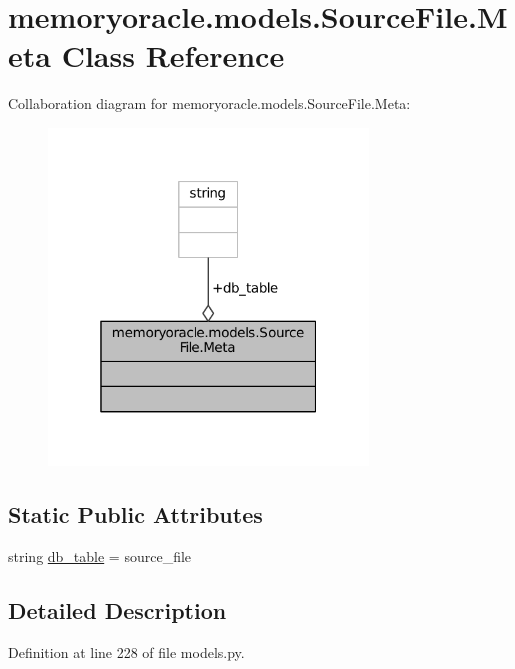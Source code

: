 \hypertarget{classmemoryoracle_1_1models_1_1SourceFile_1_1Meta}{}\section{memoryoracle.\+models.\+Source\+File.\+Meta Class Reference}
\label{classmemoryoracle_1_1models_1_1SourceFile_1_1Meta}


Collaboration diagram for memoryoracle.\+models.\+Source\+File.\+Meta\+:\nopagebreak
\begin{figure}[H]
\begin{center}
\leavevmode
\includegraphics[width=241pt]{classmemoryoracle_1_1models_1_1SourceFile_1_1Meta__coll__graph}
\end{center}
\end{figure}
\subsection*{Static Public Attributes}
\begin{DoxyCompactItemize}
\item 
string \hyperlink{classmemoryoracle_1_1models_1_1SourceFile_1_1Meta_a639d7e9516dab6a2f571baf647404617}{db\+\_\+table} = \textquotesingle{}source\+\_\+file\textquotesingle{}
\end{DoxyCompactItemize}


\subsection{Detailed Description}


Definition at line 228 of file models.\+py.



